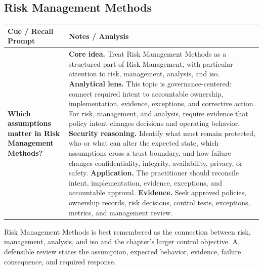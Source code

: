 \documentclass[11pt]{article}
\newcommand{\CornellHeader}{%
\rowcolor{Navy}\color{white}\bfseries Cue / Recall Prompt & \color{white}\bfseries Notes / Analysis\\\hline}
\newcommand{\CornellRow}[2]{%
\cellcolor{CueGray}\RaggedRight\textbf{#1} & \RaggedRight #2\\\hline}
\begin{document}
\subsection*{Risk Management Methods}
\begin{longtable}{>{\RaggedRight\arraybackslash}p{}|>{\RaggedRight\arraybackslash}p{}}
\CornellHeader
\CornellRow{Which assumptions matter in Risk Management Methods?}{\textbf{Core idea.} Treat Risk Management Methods as a structured part of Risk Management, with particular attention to risk, management, analysis, and iso. \textbf{Analytical lens.} This topic is governance-centered: connect required intent to accountable ownership, implementation, evidence, exceptions, and corrective action. For risk, management, and analysis, require evidence that policy intent changes decisions and operating behavior. \textbf{Security reasoning.} Identify what must remain protected, who or what can alter the expected state, which assumptions cross a trust boundary, and how failure changes confidentiality, integrity, availability, privacy, or safety. \textbf{Application.} The practitioner should reconcile intent, implementation, evidence, exceptions, and accountable approval. \textbf{Evidence.} Seek approved policies, ownership records, risk decisions, control tests, exceptions, metrics, and management review.}
\end{longtable}
\begin{topicsummary}
Risk Management Methods is best remembered as the connection between risk, management, analysis, and iso and the chapter's larger control objective. A defensible review states the assumption, expected behavior, evidence, failure consequence, and required response.
\end{topicsummary}
\end{document}

